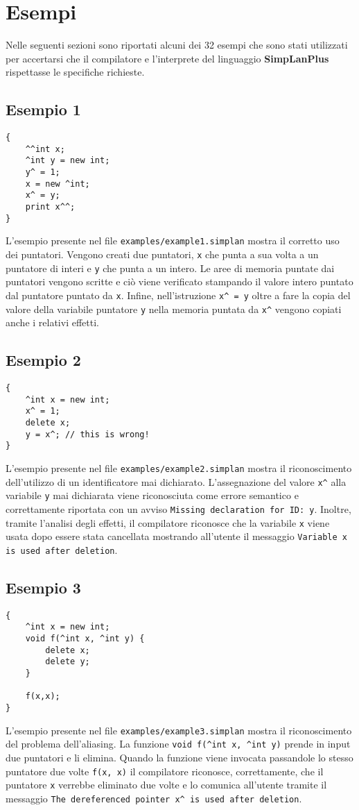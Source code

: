 \documentclass[../report.tex]{subfiles}
\begin{document}
\chapter{Esempi}\label{c:esempi}
Nelle seguenti sezioni sono riportati alcuni dei 32 esempi che sono stati utilizzati per accertarsi che il compilatore e l'interprete del linguaggio \textbf{SimpLanPlus} rispettasse le specifiche richieste.
\section{Esempio 1}\label{s:esempio1}
\begin{lstlisting}
{
    ^^int x;
    ^int y = new int;
    y^ = 1;
    x = new ^int;
    x^ = y;
    print x^^;
}
\end{lstlisting}
L'esempio presente nel file \verb|examples/example1.simplan| mostra il corretto uso dei puntatori.
Vengono creati due puntatori, \verb|x| che punta a sua volta a un puntatore di interi e \verb|y| che punta a un intero.
Le aree di memoria puntate dai puntatori vengono scritte e ciò viene verificato stampando il valore intero puntato dal puntatore puntato da \verb|x|.
Infine, nell'istruzione \verb|x^ = y| oltre a fare la copia del valore della variabile puntatore \verb|y| nella memoria puntata da \verb|x^| vengono copiati anche i relativi effetti.

\section{Esempio 2}\label{s:esempio2}
\begin{lstlisting}
{
    ^int x = new int;
    x^ = 1;
    delete x;
    y = x^; // this is wrong!
}
\end{lstlisting}
L'esempio presente nel file \verb|examples/example2.simplan| mostra il riconoscimento dell'utilizzo di un identificatore mai dichiarato.
L'assegnazione del valore \verb|x^| alla variabile \verb|y| mai dichiarata viene riconosciuta come errore semantico e correttamente riportata con un avviso \verb|Missing declaration for ID: y|.
Inoltre, tramite l'analisi degli effetti, il compilatore riconosce che la variabile \verb|x| viene usata dopo essere stata cancellata mostrando all'utente il messaggio \verb|Variable x is used after deletion|.

\section{Esempio 3}\label{s:esempio3}
\begin{lstlisting}
{
    ^int x = new int;
    void f(^int x, ^int y) {
        delete x;
        delete y;
    }

    f(x,x);
}
\end{lstlisting}
L'esempio presente nel file \verb|examples/example3.simplan| mostra il riconoscimento del problema dell'aliasing.
La funzione \verb|void f(^int x, ^int y)| prende in input due puntatori e li elimina.
Quando la funzione viene invocata passandole lo stesso puntatore due volte \verb|f(x, x)| il compilatore riconosce, correttamente, che il puntatore \verb|x| verrebbe eliminato due volte e lo comunica all'utente tramite il messaggio \verb|The dereferenced pointer x^ is used after deletion|.
\end{document}
